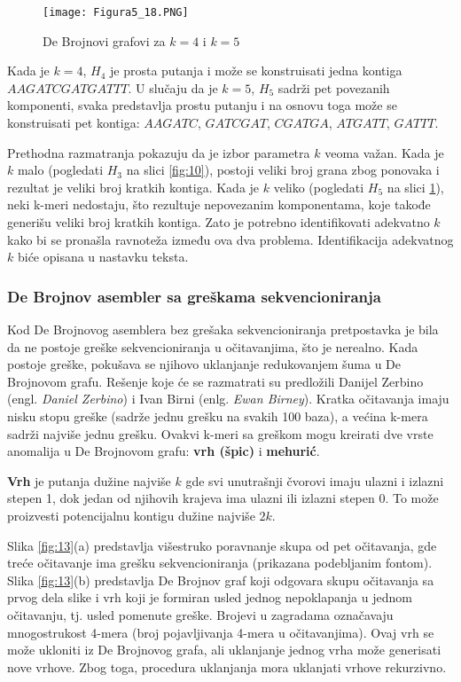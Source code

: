 \documentclass[12pt,oneside]{memoir}
\begin{document}
\begin{figure}[!ht]
\centering
\texttt{[image: Figura5\_18.PNG]}
\caption{De Brojnovi grafovi za $k = 4$ i $k = 5$ \cite{WingKinSung}}
\label{fig:12}
\end{figure}

Kada je $k = 4$, $H_4$ je prosta putanja i može se konstruisati jedna kontiga $AAGATCGATGATTT$. U slučaju da je $k = 5$, $H_5$ sadrži pet povezanih komponenti, svaka predstavlja prostu putanju i na osnovu toga može se konstruisati pet kontiga: $AAGATC$, $GATCGAT$, $CGATGA$, $ATGATT$, $GATTT$.

Prethodna razmatranja pokazuju da je izbor parametra $k$ veoma važan. Kada je $k$ malo (pogledati $H_3$ na slici \ref{fig:10}), postoji veliki broj grana zbog ponovaka i rezultat je veliki broj kratkih kontiga. Kada je $k$ veliko (pogledati $H_5$ na slici \ref{fig:12}), neki k-meri nedostaju, što rezultuje nepovezanim komponentama, koje takođe generišu veliki broj kratkih kontiga. Zato je potrebno identifikovati adekvatno $k$ kako bi se pronašla ravnoteža između ova dva problema. Identifikacija adekvatnog $k$ biće opisana u nastavku teksta.

\subsubsection{De Brojnov asembler sa greškama sekvencioniranja}

Kod De Brojnovog asemblera bez grešaka sekvencioniranja pretpostavka je bila da ne postoje greške sekvencioniranja u očitavanjima, što je nerealno. Kada postoje greške, pokušava se njihovo uklanjanje redukovanjem šuma u De Brojnovom grafu. Rešenje koje će se razmatrati su predložili Danijel Zerbino (engl. \textit{Daniel Zerbino}) i Ivan Birni (enlg. \textit{Ewan Birney}). Kratka očitavanja imaju nisku stopu greške (sadrže jednu grešku na svakih 100 baza), a većina k-mera sadrži najviše jednu grešku. Ovakvi k-meri sa greškom mogu kreirati dve vrste anomalija u De Brojnovom grafu: \textbf{vrh (špic)} i \textbf{mehurić}.

\textbf{Vrh} je putanja dužine najviše $k$ gde svi unutrašnji čvorovi imaju ulazni i izlazni stepen 1, dok jedan od njihovih krajeva ima ulazni ili izlazni stepen 0. To može proizvesti potencijalnu kontigu dužine najviše $2k$.

Slika \ref{fig:13}(a) predstavlja višestruko poravnanje skupa od pet očitavanja, gde treće očitavanje ima grešku sekvencioniranja (prikazana podebljanim fontom). Slika \ref{fig:13}(b) predstavlja De Brojnov graf koji odgovara skupu očitavanja sa prvog dela slike i vrh koji je formiran usled jednog nepoklapanja u jednom očitavanju, tj. usled pomenute greške. Brojevi u zagradama označavaju mnogostrukost 4-mera (broj pojavljivanja 4-mera u očitavanjima). Ovaj vrh se može ukloniti iz De Brojnovog grafa, ali uklanjanje jednog vrha može generisati nove vrhove. Zbog toga, procedura uklanjanja mora uklanjati vrhove rekurzivno.
\end{document}
